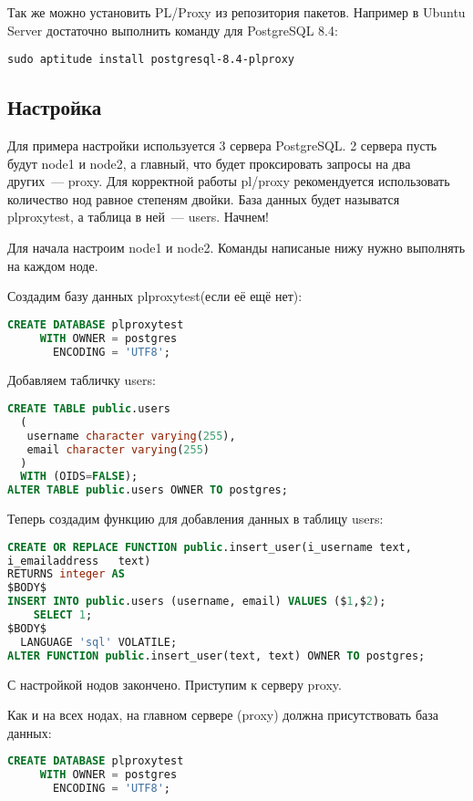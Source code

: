 Так же можно установить PL/Proxy из репозитория пакетов. 
Например в Ubuntu Server достаточно выполнить команду для PostgreSQL 8.4:
\begin{lstlisting}[label=lst:plproxy1,caption=Установка]
sudo aptitude install postgresql-8.4-plproxy
\end{lstlisting}

\subsection{Настройка}
Для примера настройки используется 3 сервера PostgreSQL. 2 сервера пусть будут node1 и node2, 
а главный, что будет проксировать запросы на два других~--- proxy.
Для корректной работы pl/proxy рекомендуется использовать количество нод равное степеням двойки. 
База данных будет называтся plproxytest, а таблица в ней~--- users. Начнем!

Для начала настроим node1 и node2. Команды написаные нижу нужно выполнять на каждом ноде.

Создадим базу данных plproxytest(если её ещё нет):
\begin{lstlisting}[language=SQL,label=lst:plproxy2,caption=Настройка]
CREATE DATABASE plproxytest
     WITH OWNER = postgres
       ENCODING = 'UTF8';
\end{lstlisting}

Добавляем табличку users:
\begin{lstlisting}[language=SQL,label=lst:plproxy3,caption=Настройка]
CREATE TABLE public.users
  (
   username character varying(255),
   email character varying(255)
  )
  WITH (OIDS=FALSE);
ALTER TABLE public.users OWNER TO postgres;
\end{lstlisting}
  
Теперь создадим функцию для добавления данных в таблицу users:
\begin{lstlisting}[language=SQL,label=lst:plproxy4,caption=Настройка]
CREATE OR REPLACE FUNCTION public.insert_user(i_username text, 
i_emailaddress   text)
RETURNS integer AS
$BODY$
INSERT INTO public.users (username, email) VALUES ($1,$2);
    SELECT 1;
$BODY$
  LANGUAGE 'sql' VOLATILE;
ALTER FUNCTION public.insert_user(text, text) OWNER TO postgres;
\end{lstlisting}

С настройкой нодов закончено. Приступим к серверу proxy.

Как и на всех нодах, на главном сервере (proxy) должна присутствовать база данных: 
\begin{lstlisting}[language=SQL,label=lst:plproxy5,caption=Настройка]
CREATE DATABASE plproxytest
     WITH OWNER = postgres
       ENCODING = 'UTF8';
\end{lstlisting}

